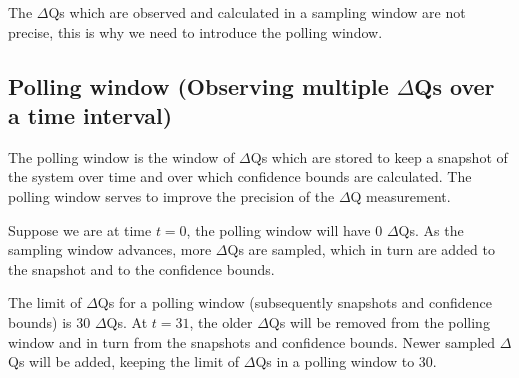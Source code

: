     The $\Delta$Qs which are observed and calculated in a sampling window are not precise, this is why we need to introduce the polling window.

    \subsection{Polling window (Observing multiple $\Delta$Qs over a time interval)}
        The polling window is the window of $\Delta$Qs which are stored to keep a snapshot of the system over time and over which confidence bounds are calculated. The polling window serves to improve the precision of the $\Delta$Q measurement.
        
        Suppose we are at time $t = 0$, the polling window will have 0 $\Delta$Qs. As the sampling window advances, more $\Delta$Qs are sampled, which in turn are added to the snapshot and to the confidence bounds.

        The limit of $\Delta$Qs for a polling window (subsequently snapshots and confidence bounds) is 30 $\Delta$Qs. At $t= 31$, the older $\Delta$Qs will be removed from the polling window and in turn from the snapshots and confidence bounds. Newer sampled $\Delta$Qs will be added, keeping the limit of $\Delta$Qs in a polling window to 30.

